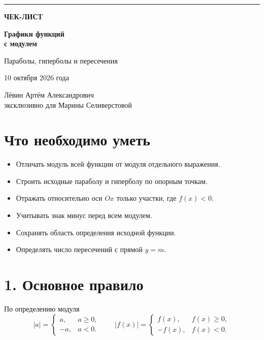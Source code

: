 \documentclass[a4paper,12pt]{article}
\newcommand{\accentsection}[1]{\section*{\color{darkaccent}#1}}
\begin{document}
\thispagestyle{empty}
\begin{titlepage}
\centering
\vspace*{35mm}
{\color{accent}\rule{46mm}{1.1pt}}\par
\vspace{21mm}
{\fontsize{23}{28}\selectfont\bfseries ЧЕК-ЛИСТ\par}
\vspace{10mm}
{\fontsize{19}{24}\selectfont\color{darkaccent}\bfseries Графики функций\\ с модулем\par}
\vspace{12mm}
{\large Параболы, гиперболы и пересечения\par}
\vspace{15mm}
{\color{softgray}10 октября 2026 года\par}
\vfill
{\small Лёвин Артём Александрович\\[2mm] эксклюзивно для Марины Селиверстовой\par}
\vspace{15mm}
\vspace{5mm}
\end{titlepage}

\accentsection{Что необходимо уметь}
\begin{itemize}[label=$\square$]
\item Отличать модуль всей функции от модуля отдельного выражения.
\item Строить исходные параболу и гиперболу по опорным точкам.
\item Отражать относительно оси $Ox$ только участки, где $f(x)<0$.
\item Учитывать знак минус перед всем модулем.
\item Сохранять область определения исходной функции.
\item Определять число пересечений с прямой $y=m$.
\end{itemize}

\accentsection{1. Основное правило}
По определению модуля
\[
|a|=\begin{cases}a,&a\ge 0,\\-a,&a<0.\end{cases}
\qquad
|f(x)|=\begin{cases}f(x),&f(x)\ge0,\\-f(x),&f(x)<0.\end{cases}
\]
\end{document}
